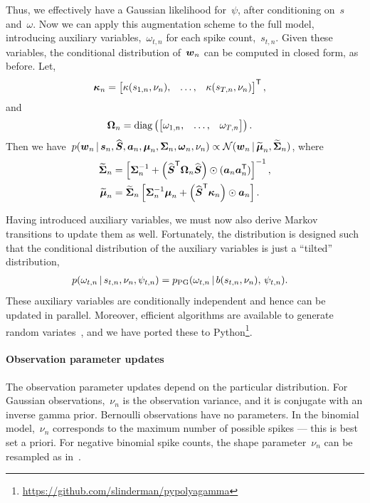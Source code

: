 Thus, we effectively have a Gaussian likelihood for~$\psi$, after conditioning 
on~$s$ and~$\omega$. Now we can apply this augmentation scheme to the full
model, introducing auxiliary variables,~$\omega_{t,n}$ for each spike count,~$s_{t,n}$.
Given these variables, the conditional distribution of~$\boldsymbol{w}_n$ can be computed in closed form,
as before. Let,
\begin{align}
  \boldsymbol{\kappa}_n
  &= \begin{bmatrix} \kappa(s_{1,n}, \nu_n), &\ldots, &\kappa(s_{T,n}, \nu_n)
  \end{bmatrix}^{\mathsf{T}},
\end{align}
and
\begin{align}
  \boldsymbol{\Omega}_n &= \mathrm{diag} \left(
  \begin{bmatrix}
    \omega_{1,n}, & \ldots, & \omega_{T,n}
  \end{bmatrix}
  \right).
\end{align}
Then we have~$
  p(\boldsymbol{w}_n \,|\, \boldsymbol{s}_n,  \widehat{\boldsymbol{S}}, \boldsymbol{a}_n, \boldsymbol{\mu}_n, \boldsymbol{\Sigma}_n, \boldsymbol{\omega}_n, \nu_n)
  \propto \mathcal{N}(\boldsymbol{w}_n \,|\, \widetilde{\boldsymbol{\mu}}_n, \widetilde{\boldsymbol{\Sigma}}_n)$,
where
\begin{align}
  \widetilde{\boldsymbol{\Sigma}}_n &= \left[ \boldsymbol{\Sigma}_n^{-1} +
  \left(\widehat{\boldsymbol{S}}^{\mathsf{T}} \boldsymbol{\Omega}_n \widehat{\boldsymbol{S}} \right) \odot (\boldsymbol{a}_n \boldsymbol{a}_n^{\mathsf{T}}) \right]^{-1}, \\
  \widetilde{\boldsymbol{\mu}}_n &= \widetilde{\boldsymbol{\Sigma}}_n \left[ \boldsymbol{\Sigma}_n^{-1} \boldsymbol{\mu}_n +
  \left(\widehat{\boldsymbol{S}}^{\mathsf{T}} \boldsymbol{\kappa}_n \right) \odot \boldsymbol{a}_n \right].
\end{align}

Having introduced auxiliary variables, we must now also derive
Markov transitions to update them as well. Fortunately, the
\polyagamma distribution is designed such that the conditional
distribution of the auxiliary variables is just a ``tilted'' \polyagamma
distribution,
\begin{align}
  p(\omega_{t,n} \,|\, s_{t,n}, \nu_n, \psi_{t,n})
  &= p_{\mathrm{PG}}(\omega_{t,n} \,|\, b(s_{t,n}, \nu_n), \, \psi_{t,n}).
\end{align}
These auxiliary variables are conditionally independent and hence can
be updated in parallel. Moreover, efficient algorithms are available
to generate \polyagamma random variates~\cite{windle2014sampling}, and
we have ported these to Python\footnote{\url{https://github.com/slinderman/pypolyagamma}}.

\paragraph{Observation parameter updates}
The observation parameter updates depend on the particular distribution.
For Gaussian observations,~$\nu_n$ is the observation variance, and
it is conjugate with an inverse gamma prior.
Bernoulli observations have no parameters.
In the binomial model,~$\nu_n$ corresponds to the maximum number of
possible spikes --- this is best set a priori.
For negative binomial spike counts, the shape parameter~$\nu_n$ can
be resampled as in~\cite{Zhou2012}.


